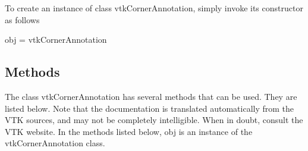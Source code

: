 To create an instance of class vtk\-Corner\-Annotation, simply invoke its constructor as follows \begin{DoxyVerb}  obj = vtkCornerAnnotation
\end{DoxyVerb}
 \hypertarget{vtkwidgets_vtkxyplotwidget_Methods}{}\subsection{Methods}\label{vtkwidgets_vtkxyplotwidget_Methods}
The class vtk\-Corner\-Annotation has several methods that can be used. They are listed below. Note that the documentation is translated automatically from the V\-T\-K sources, and may not be completely intelligible. When in doubt, consult the V\-T\-K website. In the methods listed below, {\ttfamily obj} is an instance of the vtk\-Corner\-Annotation class. 

